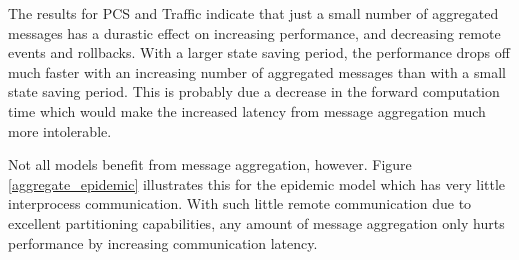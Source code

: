 \documentclass[11pt]{book}
\begin{document}
The results for PCS and Traffic indicate that just a small number of aggregated messages has
a durastic effect on increasing performance, and decreasing remote events and rollbacks.  With
a larger state saving period, the performance drops off much faster with an increasing number
of aggregated messages than with a small state saving period.  This is probably due a decrease
in the forward computation time which would make the increased latency from message aggregation
much more intolerable.  

Not all models benefit from message aggregation, however.  Figure \ref{aggregate_epidemic}
illustrates this for the epidemic model which has very little interprocess communication.
With such little remote communication due to excellent partitioning capabilities, any amount
of message aggregation only hurts performance by increasing communication latency.
\end{document}
